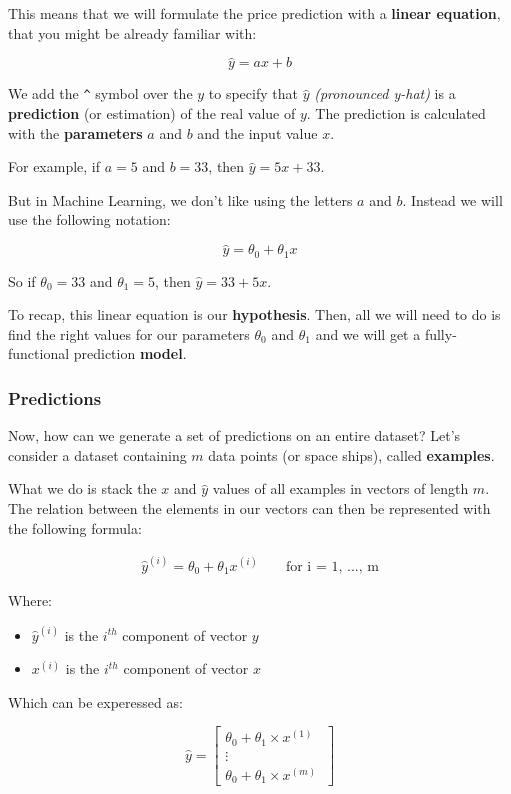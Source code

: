 This means that we will formulate the price prediction with a \textbf{linear equation}, that you might be already familiar with:

$$
\hat{y} = ax + b
$$

We add the \texttt{\^} symbol over the $y$ to specify that $\hat{y}$ \textit{(pronounced y-hat)} is a \textbf{prediction} (or estimation) of the real value of $y$. The prediction is calculated with the \textbf{parameters} $a$ and $b$ and the input value $x$.

For example, if $a = 5$ and $b = 33$, then $\hat{y} = 5x + 33$.

But in Machine Learning, we don't like using the letters $a$ and $b$. Instead we will use the following notation:

$$
\hat{y} = \theta_0 + \theta_1 x
$$

So if $\theta_0 = 33$ and $\theta_1 = 5$, then $\hat{y} = 33+ 5x$.

To recap, this linear equation is our \textbf{hypothesis}. Then, all we will need to do is find the right values for our parameters $\theta_0$ and $\theta_1$ and we will get a fully-functional prediction \textbf{model}.


\subsubsection*{Predictions}
Now, how can we generate a set of predictions on an entire dataset? Let's consider a dataset containing $m$ data points (or space ships), called \textbf{examples}.

What we do is stack the $x$ and $\hat{y}$ values of all examples in vectors of length $m$. The relation between the elements in our vectors can then be represented with the following formula:

$$
\begin{matrix}
\hat{y}^{(i)} = \theta_0 + \theta_1 x^{(i)} & & \text{ for i = 1, ..., m}
\end{matrix}
$$  

Where:
\begin{itemize}
    \item $\hat{y}^{(i)}$ is the $i^{th}$ component of vector $y$
    \item $x^{(i)}$ is the $i^{th}$ component of vector $x$   
\end{itemize}

Which can be experessed as:

$$
\hat{y} = \begin{bmatrix}\theta_0 + \theta_1 \times x^{(1)} \\ \vdots \\  \theta_0 + \theta_1 \times x^{(m)}\ \end{bmatrix}
$$  

